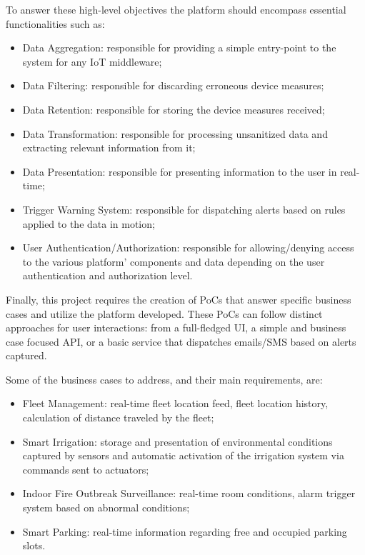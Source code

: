 To answer these high-level objectives the platform should encompass essential functionalities such as:

\begin{itemize}
    \item Data Aggregation: responsible for providing a simple entry-point to the system for any \gls{IoT} middleware;
    \item Data Filtering: responsible for discarding erroneous device measures; 
    \item Data Retention: responsible for storing the device measures received; 
    \item Data Transformation: responsible for processing unsanitized data and extracting relevant information from it;
    \item Data Presentation: responsible for presenting information to the user in real-time;
    \item Trigger Warning System: responsible for dispatching alerts based on rules applied to the data in motion;
    \item User Authentication/Authorization: responsible for allowing/denying access to the various platform' components and data depending on the user authentication and authorization level.
\end{itemize}

Finally, this project requires the creation of \gls{PoC}s that answer specific business cases and utilize the platform developed. These \gls{PoC}s can follow distinct approaches for user interactions: from a full-fledged \gls{UI}, a simple and business case focused \gls{API}, or a basic service that dispatches emails/SMS based on alerts captured.

Some of the business cases to address, and their main requirements, are:

\begin{itemize}
    \item Fleet Management: real-time fleet location feed, fleet location history, calculation of distance traveled by the fleet; 
    \item Smart Irrigation: storage and presentation of environmental conditions captured by sensors and automatic activation of the irrigation system via commands sent to actuators;
    \item Indoor Fire Outbreak Surveillance: real-time room conditions, alarm trigger system based on abnormal conditions;
    \item Smart Parking: real-time information regarding free and occupied parking slots.
\end{itemize}

